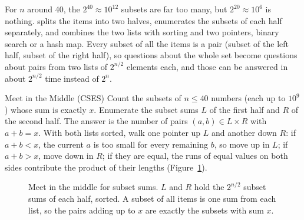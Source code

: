 For $n$ around 40, the $2^{40} \approx 10^{12}$ subsets are far too many, but $2^{20} \approx 10^6$ is nothing.
 splits the items into two halves, enumerates the subsets of each half separately, and combines the
two lists with sorting and two pointers, binary search or a hash map. Every subset of all the items is a pair (subset of the
left half, subset of the right half), so questions about the whole set become questions about pairs from two lists of
$2^{n/2}$ elements each, and those can be answered in about $2^{n/2}$ time instead of $2^n$.

\begin{problem}{Meet in the Middle (CSES)}
Count the subsets of $n \le 40$ numbers (each up to $10^9$) whose sum is exactly $x$.
\solution Enumerate the subset sums $L$ of the first half and $R$ of the second half. The answer is the number of pairs
$(a, b) \in L \times R$ with $a + b = x$. With both lists sorted, walk one pointer up $L$ and another down $R$: if
$a + b < x$, the current $a$ is too small for every remaining $b$, so move up in $L$; if $a + b > x$, move down in $R$; if
they are equal, the runs of equal values on both sides contribute the product of their lengths (Figure~\ref{fig:mitm}).
\end{problem}

\begin{figure}[htbp]
\centering
{}
\caption{Meet in the middle for subset sums. $L$ and $R$ hold the $2^{n/2}$ subset sums of each half, sorted. A subset of
all items is one sum from each list, so the pairs adding up to $x$ are exactly the subsets with sum $x$.}
\label{fig:mitm}
\end{figure}

